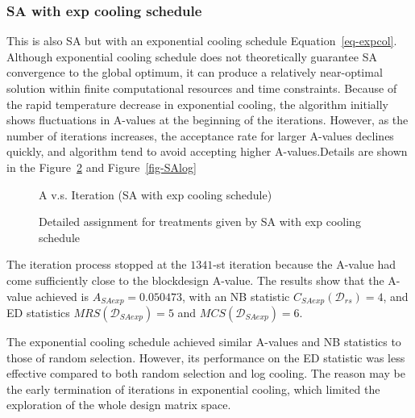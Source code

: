 \documentclass[
  a4paper,
  oneside,
  openany,
  12pt,
  onecolumn]{book}
\theoremstyle{definition}
\theoremstyle{definition}
\theoremstyle{plain}
\theoremstyle{remark}
\begin{document}
\subsubsection{SA with exp cooling
schedule}\label{sa-with-exp-cooling-schedule}

This is also SA but with an exponential cooling schedule
Equation~\ref{eq-expcol}. Although exponential cooling schedule does not
theoretically guarantee SA convergence to the global optimum, it can
produce a relatively near-optimal solution within finite computational
resources and time constraints. Because of the rapid temperature
decrease in exponential cooling, the algorithm initially shows
fluctuations in A-values at the beginning of the iterations. However, as
the number of iterations increases, the acceptance rate for larger
A-values declines quickly, and algorithm tend to avoid accepting higher
A-values.Details are shown in the Figure~\ref{fig-SAexp} and
Figure~\ref{fig-SAlog}

\begin{figure}


\caption{\label{fig-AvISAexp}A v.s. Iteration (SA with exp cooling
schedule)}

\end{figure}%

\begin{figure}


\caption{\label{fig-SAexp}Detailed assignment for treatments given by SA
with exp cooling schedule}

\end{figure}%

The iteration process stopped at the \(1341\)-st iteration because the
A-value had come sufficiently close to the blockdesign A-value. The
results show that the A-value achieved is \(A_{SAexp} = 0.050473\), with
an NB statistic \(C_{SAexp}(\mathcal{D}_{rs})=4\), and ED statistics
\(MRS(\mathcal{D}_{SAexp})=5\) and \(MCS(\mathcal{D}_{SAexp})=6\).

The exponential cooling schedule achieved similar A-values and NB
statistics to those of random selection. However, its performance on the
ED statistic was less effective compared to both random selection and
log cooling. The reason may be the early termination of iterations in
exponential cooling, which limited the exploration of the whole design
matrix space.
\end{document}
